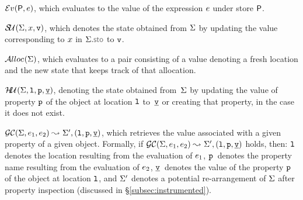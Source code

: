 \begin{description}
\setlength{\itemsep}{0.2em}
  \item[\jsil Expression Evaluation,] $\mathcal{E}v_{}({\sf P}, e)$, which evaluates to the value of the \jsil expression $e$ under store ${\sf P}$. 


  \item[Store Update,] $\mathcal{S\!U}_{}(\Sigma, x, \mathtt{v})$, which denotes the state obtained from $\Sigma$ 
             by updating the value corresponding to $x$ in $\absstate.\stosel$ to $\mathtt{v}$. 

  \item[Heap Allocation,] $\mathcal{A}lloc_{}(\Sigma)$, which evaluates to a pair consisting of a value denoting a fresh location and the new state that keeps track of that allocation. %
%             

   \item[Heap Update,] $\mathcal{H\!U}_{}(\Sigma, \mathtt{l}, \mathtt{p}, \underline{\mathtt{v}})$, denoting the state obtained from~$\Sigma$ by updating the value of property $\mathtt{p}$ of the object at location $\mathtt{l}$ to~$\underline{\mathtt{v}}$ or creating that property, in the
             case it does not exist.

  \item[GetCell,] $\mathcal{GC}(\Sigma, e_1, e_2) \leadsto_{} \Sigma', (\mathtt{l}, \mathtt{p}, \underline{\mathtt{v}})$, which retrieves the value associated with a given property of a given object. Formally, if $\mathcal{GC}(\Sigma, e_1, e_2) \leadsto_{} \Sigma', (\mathtt{l}, \mathtt{p}, \underline{\mathtt{v}})$ holds, 
          then: $\mathtt{l}$ denotes the location resulting from the evaluation of $e_1$, 
          $\mathtt{p}$~denotes the property name resulting from the evaluation of $e_2$, 
          $\underline{\mathtt{v}}$~denotes the value of the property $\mathtt{p}$ of the object at location $\mathtt{l}$, 
          and $\Sigma'$ denotes a potential re-arrangement of $\Sigma$ after property inspection (discussed in \S\ref{subsec:instrumented}). 
            


\end{description}
